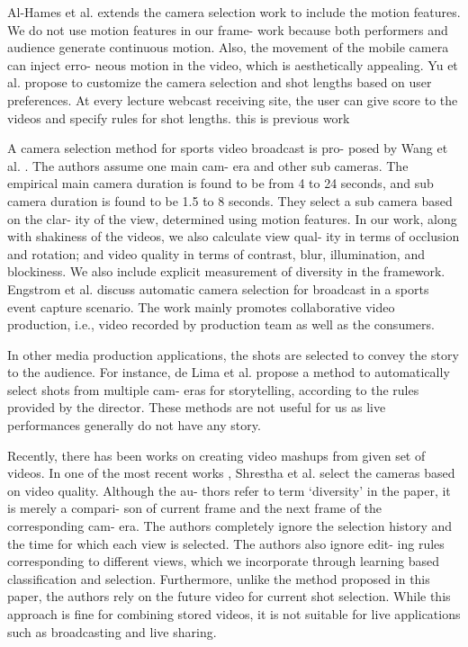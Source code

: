 \documentclass{sig-alternate}
\begin{document}
Al-Hames et al. \cite{3} extends the camera selection work to include
the motion features. We do not use motion features in our frame-
work because both performers and audience generate continuous
motion. Also, the movement of the mobile camera can inject erro-
neous motion in the video, which is aesthetically appealing. Yu et
al. \cite{20} propose to customize the camera selection and shot lengths
based on user preferences. At every lecture webcast receiving site,
the user can give score to the videos and specify rules for shot
lengths. this is previous work

A camera selection method for sports video broadcast is pro-
posed by Wang et al. \cite{16}. The authors assume one main cam-
era and other sub cameras. The empirical main camera duration is
found to be from 4 to 24 seconds, and sub camera duration is found
to be 1.5 to 8 seconds. They select a sub camera based on the clar-
ity of the view, determined using motion features. In our work,
along with shakiness of the videos, we also calculate view qual-
ity in terms of occlusion and rotation; and video quality in terms
of contrast, blur, illumination, and blockiness. We also include
explicit measurement of diversity in the framework. Engstrom et
al. \cite{8} discuss automatic camera selection for broadcast in a sports
event capture scenario. The work mainly promotes collaborative
video production, i.e., video recorded by production team as well
as the consumers.

In other media production applications, the shots are selected to
convey the story to the audience. For instance, de Lima et al. \cite{7} propose a method to automatically select shots from multiple cam-
eras for storytelling, according to the rules provided by the director.
These methods are not useful for us as live performances generally
do not have any story.

Recently, there has been works on creating video mashups from
given set of videos. In one of the most recent works \cite{15}, Shrestha
et al. select the cameras based on video quality. Although the au-
thors refer to term ‘diversity’ in the paper, it is merely a compari-
son of current frame and the next frame of the corresponding cam-
era. The authors completely ignore the selection history and the
time for which each view is selected. The authors also ignore edit-
ing rules corresponding to different views, which we incorporate
through learning based classification and selection. Furthermore,
unlike the method proposed in this paper, the authors rely on the
future video for current shot selection. While this approach is fine
for combining stored videos, it is not suitable for live applications
such as broadcasting and live sharing.
\end{document}
